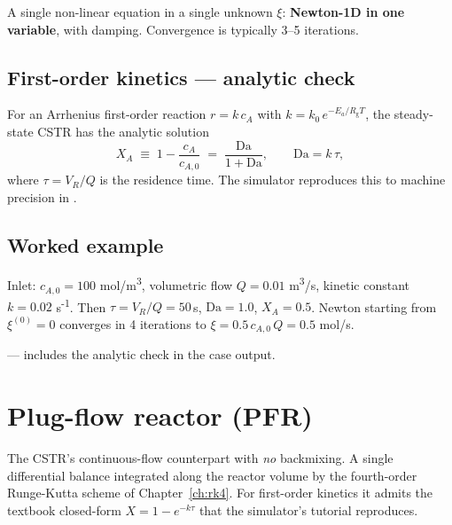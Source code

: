 \documentclass[11pt,a4paper]{article}
\newcommand{\Rgas}{R_{\!\mathrm{g}}}                %
\begin{document}
A single non-linear equation in a single unknown $\xi$: \textbf{Newton-1D
in one variable}, with damping. Convergence is typically 3--5 iterations.

\subsection{First-order kinetics --- analytic check}

For an Arrhenius first-order reaction $r = k\, c_A$ with
$k = k_0\, e^{-E_a / \Rgas T}$, the steady-state CSTR has the
analytic solution
\begin{equation}
   X_A \;\equiv\; 1 - \frac{c_A}{c_{A,0}} \;=\; \frac{\mathrm{Da}}{1 + \mathrm{Da}},
   \qquad \mathrm{Da} = k\,\tau,
\end{equation}
where $\tau = V_R / Q$ is the residence time. The simulator reproduces
this to machine precision in .

\subsection{Worked example}

\begin{example}
Inlet: $c_{A,0} = 100$ mol/m\textsuperscript{3}, volumetric flow $Q = 0.01$
m\textsuperscript{3}/s, kinetic constant $k = 0.02$ s\textsuperscript{-1}.
Then $\tau = V_R / Q = 50$\,s, $\mathrm{Da} = 1.0$, $X_A = 0.5$. Newton
starting from $\xi^{(0)} = 0$ converges in 4 iterations to
$\xi = 0.5\,c_{A,0}\,Q = 0.5$ mol/s.
\end{example}

\begin{tutoriallink}
 --- includes the analytic check in
the case output.
\end{tutoriallink}

\section{Plug-flow reactor (PFR)}\label{ch:pfr}

\begin{whatyoulllearn}
The CSTR's continuous-flow counterpart with \emph{no} backmixing. A
single differential balance integrated along the reactor volume by the
fourth-order Runge-Kutta scheme of Chapter~\ref{ch:rk4}. For
first-order kinetics it admits the textbook closed-form
$X = 1 - e^{-k\tau}$ that the simulator's tutorial reproduces.
\end{whatyoulllearn}
\end{document}
